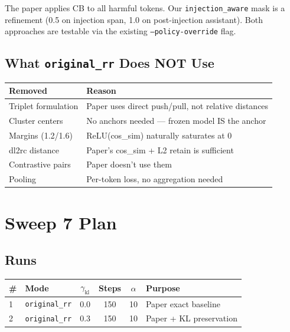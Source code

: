 \documentclass[11pt]{article}
\begin{document}
The paper applies CB to all harmful tokens. Our \texttt{injection\_aware} mask
is a refinement (0.5 on injection span, 1.0 on post-injection assistant).
Both approaches are testable via the existing \texttt{--policy-override} flag.

\subsection{What \texttt{original\_rr} Does NOT Use}

\begin{center}
\begin{tabular}{ll}
\toprule
Removed & Reason \\
\midrule
Triplet formulation & Paper uses direct push/pull, not relative distances \\
Cluster centers & No anchors needed --- frozen model IS the anchor \\
Margins (1.2/1.6) & ReLU(cos\_sim) naturally saturates at 0 \\
dl2rc distance & Paper's cos\_sim + L2 retain is sufficient \\
Contrastive pairs & Paper doesn't use them \\
Pooling & Per-token loss, no aggregation needed \\
\bottomrule
\end{tabular}
\end{center}

\section{Sweep 7 Plan}

\subsection{Runs}

\begin{center}
\begin{tabular}{llcccl}
\toprule
\# & Mode & $\gamma_\mathrm{kl}$ & Steps & $\alpha$ & Purpose \\
\midrule
1 & \texttt{original\_rr} & 0.0 & 150 & 10 & Paper exact baseline \\
2 & \texttt{original\_rr} & 0.3 & 150 & 10 & Paper + KL preservation \\
\bottomrule
\end{tabular}
\end{center}
\end{document}
